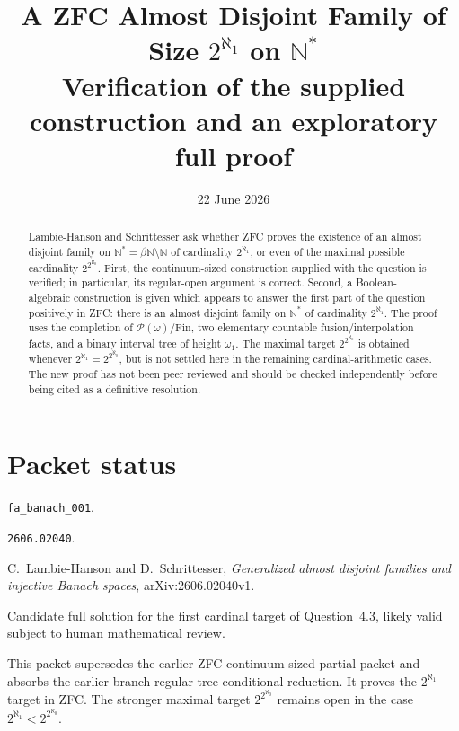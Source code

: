 \documentclass[11pt]{article}
\title{A ZFC Almost Disjoint Family of Size \(2^{\aleph_1}\) on \(\mathbb N^*\)\\
\large Verification of the supplied construction and an exploratory full proof}
\author{}
\date{22 June 2026}
\theoremstyle{definition}
\theoremstyle{remark}
\begin{document}
\maketitle

\begin{abstract}
Lambie-Hanson and Schrittesser ask whether ZFC proves the existence of an
almost disjoint family on \(\mathbb N^*=\beta\mathbb N\setminus\mathbb N\)
of cardinality \(2^{\aleph_1}\), or even of the maximal possible cardinality
\(2^{2^{\aleph_0}}\).  First, the continuum-sized construction supplied with
the question is verified; in particular, its regular-open argument is correct.
Second, a Boolean-algebraic construction is given which appears to answer the
first part of the question positively in ZFC: there is an almost disjoint
family on \(\mathbb N^*\) of cardinality \(2^{\aleph_1}\).  The proof uses the
completion of \(\mathcal P(\omega)/\mathrm{Fin}\), two elementary countable
fusion/interpolation facts, and a binary interval tree of height \(\omega_1\).
The maximal target \(2^{2^{\aleph_0}}\) is obtained whenever
\(2^{\aleph_1}=2^{2^{\aleph_0}}\), but is not settled here in the remaining
cardinal-arithmetic cases.  The new proof has not been peer reviewed and should
be checked independently before being cited as a definitive resolution.
\end{abstract}

\section*{Packet status}

\begin{description}[leftmargin=2.9cm,style=nextline]
\item[Run] \texttt{fa\_banach\_001}.
\item[Source arXiv id] \texttt{2606.02040}.
\item[Source paper] C.~Lambie-Hanson and D.~Schrittesser,
\emph{Generalized almost disjoint families and injective Banach spaces},
arXiv:2606.02040v1.
\item[Packet classification] Candidate full solution for the first cardinal
target of Question~4.3, likely valid subject to human mathematical review.
\item[Upgrade note] This packet supersedes the earlier ZFC continuum-sized
partial packet and absorbs the earlier branch-regular-tree conditional
reduction.  It proves the \(2^{\aleph_1}\) target in ZFC.  The stronger
maximal target \(2^{2^{\aleph_0}}\) remains open in the case
\(2^{\aleph_1}<2^{2^{\aleph_0}}\).
\end{description}
\end{document}
